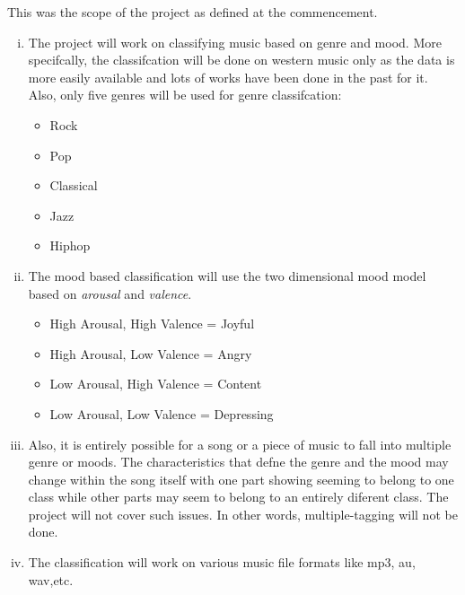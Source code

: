 This was the scope of the project as defined at the commencement.
\begin{enumerate}[(i)]
        \item The project will work on classifying music based on genre and mood. More specifcally, the classifcation will be done on western music only as the data
                is more easily available and lots of works have been done in the past for it. Also, only five genres will be used for genre classifcation:
                \begin{itemize}
                        \item Rock
                        \item Pop
                        \item Classical
                        \item Jazz
                        \item Hiphop
                \end{itemize}

            \item The mood based classification will use the two dimensional mood model based on \textit{arousal} and \textit{valence}.

            \begin{itemize}
                \item High Arousal, High Valence = Joyful
                \item High Arousal, Low Valence  = Angry
                \item Low Arousal, High Valence  = Content
                \item Low Arousal, Low Valence   = Depressing
            \end{itemize}

        \item Also, it is entirely possible for a song or a piece of music to fall into multiple genre or moods. The characteristics that defne the genre
                and the mood may change within the song itself with one part showing seeming to belong to one class while other parts may seem to belong to
                an entirely diferent class. The project will not cover such issues. In other words, multiple-tagging will not be done.

        \item The classification will work on various music file formats like mp3, au, wav,etc.

\end{enumerate}

